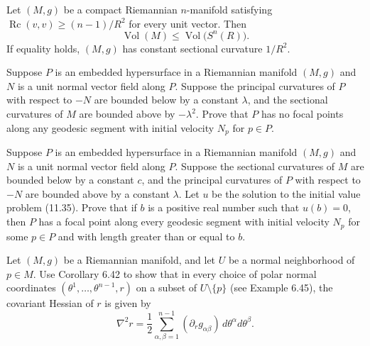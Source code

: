 \begin{corollary}
\label{cor:ricci-volume-comparison}


Let $(M,g)$ be a compact Riemannian $n$-manifold satisfying
$\operatorname{Rc}(v,v)\geq(n-1)/R^2$ for every unit vector. Then
\[
\operatorname{Vol}(M)
\leq\operatorname{Vol}\bigl(S^n(R)\bigr).
\]
If equality holds, $(M,g)$ has constant sectional curvature $1/R^2$.
\end{corollary}

\begin{exercise}\label{prob:focal-points-hypersurface}
Suppose $P$ is an embedded hypersurface in a Riemannian manifold $(M, g)$ and $N$ is a unit normal vector field along $P$. Suppose the principal curvatures of $P$ with respect to $-N$ are bounded below by a constant $\lambda$, and the sectional curvatures of $M$ are bounded above by $-\lambda^2$. Prove that $P$ has no focal points along any geodesic segment with initial velocity $N_p$ for $p \in P$.
\end{exercise}

\begin{exercise}\label{prob:focal-points-hypersurface-ii}
Suppose $P$ is an embedded hypersurface in a Riemannian manifold $(M, g)$ and $N$ is a unit normal vector field along $P$. Suppose the sectional curvatures of $M$ are bounded below by a constant $c$, and the principal curvatures of $P$ with respect to $-N$ are bounded above by a constant $\lambda$. Let $u$ be the solution to the initial value problem (11.35). Prove that if $b$ is a positive real number such that $u(b) = 0$, then $P$ has a focal point along every geodesic segment with initial velocity $N_p$ for some $p \in P$ and with length greater than or equal to $b$.
\end{exercise}

\begin{exercise}
\label{prob:hessian-polar-coordinates}

Let $(M,g)$ be a Riemannian manifold, and let $U$ be a normal neighborhood of $p \in M$. Use Corollary 6.42 to show that in every choice of polar normal coordinates $(\theta^1,\ldots,\theta^{n-1},r)$ on a subset of $U \setminus \{p\}$ (see Example 6.45), the covariant Hessian of $r$ is given by
\[
\nabla^2 r = \frac{1}{2} \sum_{\alpha,\beta=1}^{n-1} (\partial_r g_{\alpha\beta}) \, d\theta^\alpha d\theta^\beta.
\]
\end{exercise}

